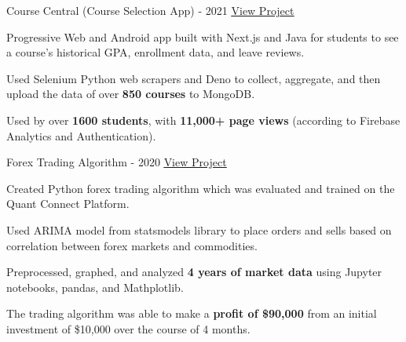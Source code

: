 

\begin{cventries}

  \cventry
    {} %
    {Course Central (Course Selection App) - 2021} %
    {\href{https://coursecentral.ca/}{\underline{View Project}}} %
    {} %
    {
      \begin{cvitems} %
        \item {Progressive Web and Android app built with Next.js and Java for students to see a course's historical GPA, enrollment data, and leave reviews.}
        \item {Used Selenium Python web scrapers and Deno to collect, aggregate, and then upload the data of over \textbf{850 courses} to MongoDB.}
        \item {Used by over \textbf{1600 students}, with \textbf{11,000+ page views} (according to Firebase Analytics and Authentication).}
      \end{cvitems}
    }

  \cventry
    {} %
    {Forex Trading Algorithm - 2020} %
    {\href{https://github.com/KnlnKS/Forex-Price-Predictor-Quantconnect}{\underline{View Project}}} %
    {} %
    {
      \begin{cvitems} %
        \item {Created Python forex trading algorithm which was evaluated and trained on the Quant Connect Platform.}
        \item {Used ARIMA model from statsmodels library to place orders and sells based on correlation between forex markets and commodities.}
        \item {Preprocessed, graphed, and analyzed \textbf{4 years of market data} using Jupyter notebooks, pandas, and Mathplotlib.}
        \item {The trading algorithm was able to make a \textbf{profit of \$90,000} from an initial investment of \$10,000 over the course of 4 months.}
      \end{cvitems}
    }


\end{cventries}
